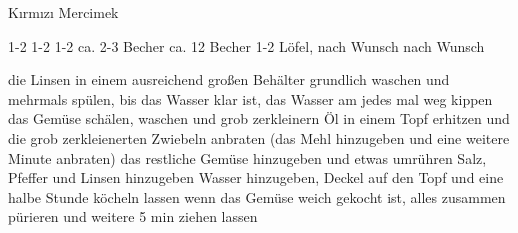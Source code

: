 \begin{recipe}{Kırmızı Mercimek}

     1-2
     1-2
     1-2
     ca. 2-3 Becher
     ca. 12 Becher 
     1-2 Löfel, nach Wunsch
     nach Wunsch
    \ingredient{}
    \ingredient{}

    \fourstar
    \ingredient{}
    \ingredient{}

     die Linsen in einem ausreichend großen Behälter grundlich waschen und mehrmals spülen, bis das Wasser klar ist, das Wasser am jedes mal weg kippen 
     das Gemüse schälen, waschen und grob zerkleinern
     Öl in einem Topf erhitzen und die grob zerkleienerten Zwiebeln anbraten
     (das Mehl hinzugeben und eine weitere Minute anbraten)
     das restliche Gemüse hinzugeben und etwas umrühren 
     Salz, Pfeffer und Linsen hinzugeben
     Wasser hinzugeben, Deckel auf den Topf und eine halbe Stunde köcheln lassen
     wenn das Gemüse weich gekocht ist, alles zusammen pürieren und weitere 5 min ziehen lassen 

\end{recipe}